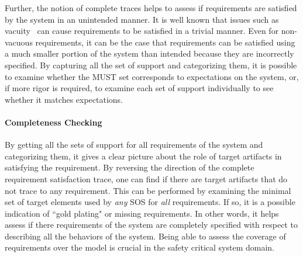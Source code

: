 Further, the notion of complete traces helps to assess if requirements are satisfied by the system in an unintended manner. It is well known that issues such as vacuity~\cite{Kupferman03:Vacuity} can cause requirements to be satisfied in a trivial manner. Even for non-vacuous requirements, it can be the case that requirements can be satisfied using a much smaller portion of the system than intended because they are incorrectly specified.  By capturing all the set of support and categorizing them, it is possible to examine whether the MUST set corresponds to expectations on the system, or, if more rigor is required, to examine each set of support individually to see whether it matches expectations.

\paragraph{Completeness Checking}

By getting all the sets of support for all requirements of the system and categorizing them,  it gives a clear picture about the role of target artifacts in satisfying the requirement.  By reversing the direction of the complete requirement satisfaction trace, one can find if there are target artifacts that do not trace to any requirement.  This can be performed by examining the minimal set of target elements used by {\em any} SOS for {\em all} requirements.  If so,  it is a possible indication of ``gold plating" or missing requirements. In other words, it helps assess if there requirements of the system are completely specified with respect to describing all the behaviors of the system. Being able to assess the coverage of requirements over the model is crucial in the safety critical system domain.

